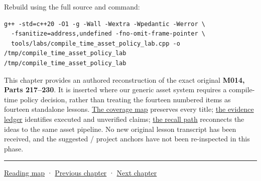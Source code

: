 Rebuild using the full source and command:

\begin{verbatim}
g++ -std=c++20 -O1 -g -Wall -Wextra -Wpedantic -Werror \
  -fsanitize=address,undefined -fno-omit-frame-pointer \
  tools/labs/compile_time_asset_policy_lab.cpp -o /tmp/compile_time_asset_policy_lab
/tmp/compile_time_asset_policy_lab
\end{verbatim}

This chapter provides an authored reconstruction of the exact original \textbf{M014, Parts 217--230}. It is inserted where our generic asset system requires a compile-time policy decision, rather than treating the fourteen numbered items as fourteen standalone lessons. \hyperref[appendix-fd090d982a15-m014-parts-217230-one-tile-planner-and-its-compile-time-policy-decisions]{The coverage map} preserves every title; \hyperref[appendix-a103e7846d21-phase-4-additive-reconstruction-m014-parts-217230]{the evidence ledger} identifies executed and unverified claims; \hyperref[appendix-960160274237-the-tile-planner-makes-a-choice-m014-reconstruction]{the recall path} reconnects the ideas to the same asset pipeline. No new original lesson transcript has been received, and the suggested  /  project anchors have not been re-inspected in this phase.

\begin{center}\rule{0.5\linewidth}{0.5pt}\end{center}

\hyperref[volume-reading-map]{Reading map} · \hyperref[01-foundations-i-ch004-prove-c-ownership-with-runnable-experiments]{Previous chapter} · \hyperref[01-foundations-i-ch006-grow-registries-without-invalidating-identity]{Next chapter}
